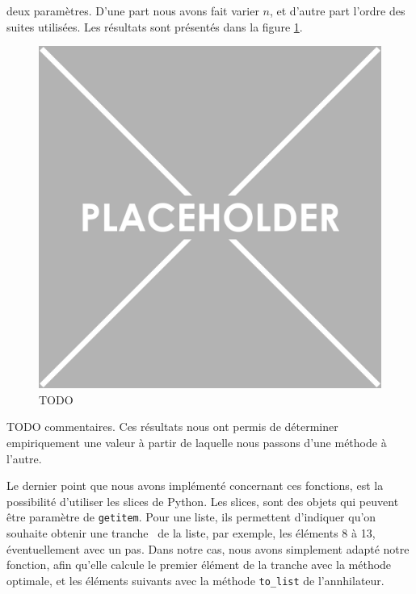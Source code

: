 \documentclass[12pt]{article}
\newlength{\charwidth}
\newcommand{\uline}{\underline{\hspace{2\charwidth}}}
\begin{document}
        deux paramètres. D'une part nous avons fait varier $n$, et d'autre part l'ordre des suites
        utilisées. Les résultats sont présentés dans la figure \ref{fig:getitem}.
        \begin{figure} \begin{center}
            \includegraphics[scale=0.4]{figures/placeholder.png}
            \caption{\label{fig:getitem}\color{red}TODO}
        \end{center} \end{figure}
        {\color{red} TODO commentaires}. Ces résultats nous ont permis de déterminer empiriquement
        une valeur à partir de laquelle nous passons d'une méthode à l'autre.\\
        \par Le dernier point que nous avons implémenté concernant ces fonctions,
        est la possibilité d'utiliser les slices de Python. Les slices, sont des objets
        qui peuvent être paramètre de \texttt{\uline getitem\uline}. Pour une liste, ils permettent
        d'indiquer qu'on souhaite obtenir une \og tranche \fg\ de la liste, par exemple, les éléments
        8 à 13, éventuellement avec un pas. Dans notre cas, nous avons simplement adapté notre
        fonction, afin qu'elle calcule le premier élément de la tranche avec la méthode optimale,
        et les éléments suivants avec la méthode \texttt{to\_list} de l'annhilateur.

       

\end{document}
